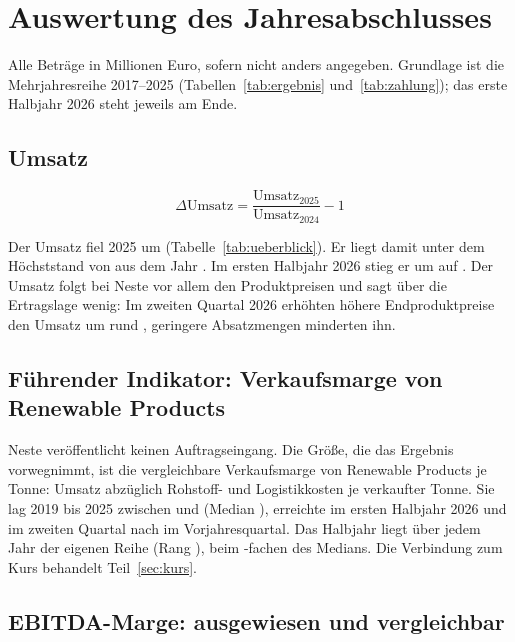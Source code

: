 \section{Auswertung des Jahresabschlusses}
\label{sec:abschluss}

Alle Betr\"age in Millionen Euro, sofern nicht anders angegeben. Grundlage ist die
Mehrjahresreihe 2017--2025 (Tabellen~\ref{tab:ergebnis} und~\ref{tab:zahlung}); das erste
Halbjahr 2026 steht jeweils am Ende.

\ergebnistabelle

\subsection{Umsatz}

\[
\Delta\text{Umsatz} = \frac{\text{Umsatz}_{2025}}{\text{Umsatz}_{2024}} - 1
\]

Der Umsatz fiel 2025 um \UmsatzDelta{} (Tabelle~\ref{tab:ueberblick}). Er liegt damit unter dem
H\"ochststand von  aus dem Jahr \UmsatzMaxJahr. Im ersten Halbjahr 2026
stieg er um \HjUmsatzDelta{} auf . Der Umsatz folgt bei Neste
vor allem den Produktpreisen und sagt \"uber die Ertragslage wenig: Im zweiten Quartal 2026
erh\"ohten h\"ohere Endproduktpreise den Umsatz um rund ,
geringere Absatzmengen minderten ihn.

\subsection{F\"uhrender Indikator: Verkaufsmarge von Renewable Products}

Neste ver\"offentlicht keinen Auftragseingang. Die Gr\"o{\ss}e, die das Ergebnis vorwegnimmt,
ist die vergleichbare Verkaufsmarge von Renewable Products je Tonne: Umsatz abz\"uglich
Rohstoff- und Logistikkosten je verkaufter Tonne. Sie lag 2019 bis 2025 zwischen
 und  (Median ),
erreichte im ersten Halbjahr 2026  und im zweiten Quartal
 nach  im Vorjahresquartal. Das
Halbjahr liegt \"uber jedem Jahr der eigenen Reihe (Rang \Pz{\MargeRangHj}), beim
\MargeFaktorHj-fachen des Medians. Die Verbindung zum Kurs behandelt
Teil~\ref{sec:kurs}.

\subsection{EBITDA-Marge: ausgewiesen und vergleichbar}

